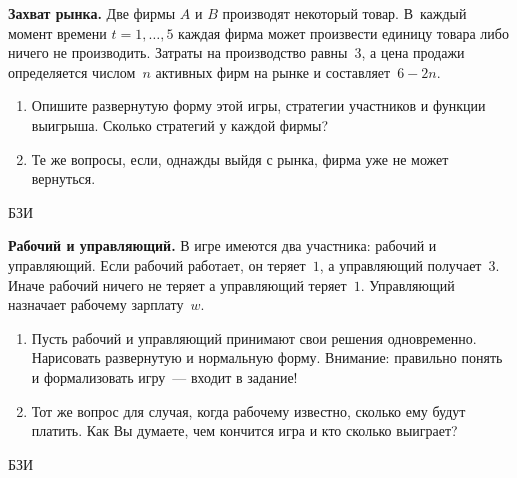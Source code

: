 \begin{problem}
 {\bf Захват рынка.} Две фирмы $A$ и $B$ производят
некоторый товар. В~каждый момент времени $t=1,\ldots,5$
каждая фирма может произвести единицу товара либо ничего не
производить. Затраты на производство равны~$3$, а цена
продажи определяется числом~$n$ активных фирм на рынке и
составляет~$6-2n$.

\begin{enumerate}

\item Опишите развернутую форму этой игры, стратегии
участников и функции выигрыша. Сколько стратегий у каждой
фирмы?

\item Те же вопросы, если, однажды выйдя с рынка, фирма уже
не может вернуться.

\end{enumerate}



\begin{source}
БЗИ
\end{source}


\begin{sol}

\end{sol}
\end{problem}



\begin{problem}
 {\bf Рабочий и управляющий.} В игре имеются два
участника: рабочий и управляющий. Если рабочий работает, он
теряет~$1$, а управляющий получает~$3$. Иначе рабочий
ничего не теряет а управляющий теряет~$1$. Управляющий
назначает рабочему зарплату~$w$.

\begin{enumerate}

\item Пусть рабочий и управляющий принимают свои решения
одновременно. Нарисовать развернутую и нормальную форму.
Внимание: правильно понять и формализовать игру~--- входит
в задание!


\item Тот же вопрос для случая, когда рабочему известно,
сколько ему будут платить. Как Вы думаете, чем кончится
игра и кто сколько выиграет?

\end{enumerate}



\begin{source}
БЗИ
\end{source}


\begin{sol}

\end{sol}
\end{problem}






